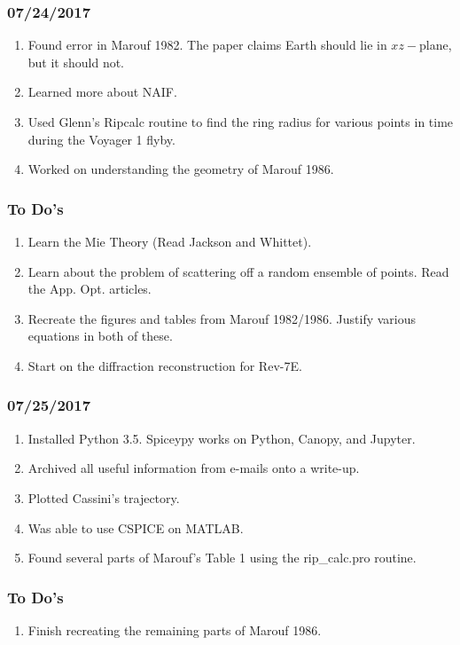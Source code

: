 \documentclass[crop=false,class=book]{standalone}
\begin{document}
\subsubsection{\footnotesize 07/24/2017}
\begin{enumerate}
    \item Found error in Marouf 1982. The paper claims Earth should lie in $xz-$plane, but it should not.
    \item Learned more about NAIF.
    \item Used Glenn's Ripcalc routine to find the ring radius for various points in time during the Voyager 1 flyby.
    \item Worked on understanding the geometry of Marouf 1986.
\end{enumerate}
\subsubsection*{\scriptsize To Do's}
\begin{enumerate}
    \item Learn the Mie Theory (Read Jackson and Whittet).
    \item Learn about the problem of scattering off a random ensemble of points. Read the App. Opt. articles.
    \item Recreate the figures and tables from Marouf 1982/1986. Justify various equations in both of these.
    \item Start on the diffraction reconstruction for Rev-7E.
\end{enumerate}
\subsubsection{\footnotesize 07/25/2017}
\begin{enumerate}
    \item Installed Python 3.5. Spiceypy works on Python, Canopy, and Jupyter.
    \item Archived all useful information from e-mails onto a write-up.
    \item Plotted Cassini's trajectory.
    \item Was able to use CSPICE on MATLAB.
    \item Found several parts of Marouf's Table 1 using the rip\_calc.pro routine.
\end{enumerate}
\subsubsection{\scriptsize{To Do's}}
\begin{enumerate}
    \item Finish recreating the remaining parts of Marouf 1986.
\end{enumerate}
\end{document}
